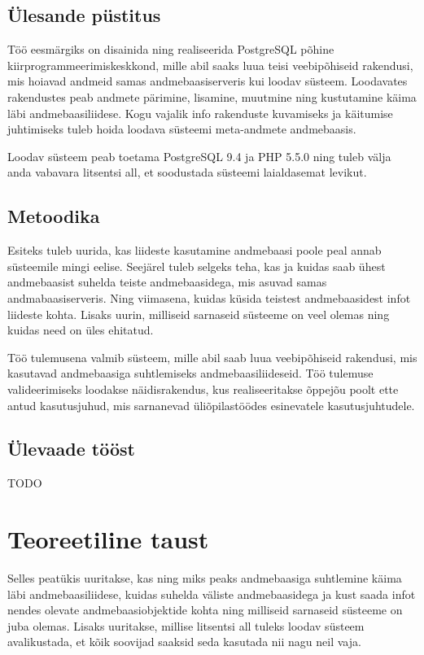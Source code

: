 \documentclass[a4paper,12pt]{article} %
\begin{document}
\subsection{Ülesande püstitus}
Töö eesmärgiks on disainida ning realiseerida PostgreSQL põhine kiirprogrammeerimiskeskkond, mille abil saaks luua teisi veebipõhiseid rakendusi, mis hoiavad andmeid samas andmebaasiserveris kui loodav süsteem. Loodavates rakendustes peab andmete pärimine, lisamine, muutmine ning kustutamine käima läbi andmebaasiliidese. Kogu vajalik info rakenduste kuvamiseks ja käitumise juhtimiseks tuleb hoida loodava süsteemi meta-andmete andmebaasis.\par
Loodav süsteem peab toetama PostgreSQL 9.4 ja PHP 5.5.0 ning tuleb välja anda vabavara litsentsi all, et soodustada süsteemi laialdasemat levikut.

\subsection{Metoodika}
Esiteks tuleb uurida, kas liideste kasutamine andmebaasi poole peal annab süsteemile mingi eelise. Seejärel tuleb selgeks teha, kas ja kuidas saab ühest andmebaasist suhelda teiste andmebaasidega, mis asuvad samas andmabaasiserveris. Ning viimasena, kuidas küsida teistest andmebaasidest infot liideste kohta.
Lisaks uurin, milliseid sarnaseid süsteeme on veel olemas ning kuidas need on üles ehitatud.\par
Töö tulemusena valmib süsteem, mille abil saab luua veebipõhiseid rakendusi, mis kasutavad andmebaasiga suhtlemiseks andmebaasiliideseid. Töö tulemuse valideerimiseks loodakse näidisrakendus, kus realiseeritakse õppejõu poolt ette antud kasutusjuhud, mis sarnanevad üliõpilastöödes esinevatele kasutusjuhtudele.
\subsection{Ülevaade tööst}
TODO
\pagebreak

\section{Teoreetiline taust}
Selles peatükis uuritakse, kas ning miks peaks andmebaasiga suhtlemine käima läbi andmebaasiliidese, kuidas suhelda väliste andmebaasidega ja kust saada infot nendes olevate andmebaasiobjektide kohta ning milliseid sarnaseid süsteeme on juba olemas. Lisaks uuritakse, millise litsentsi all tuleks loodav süsteem avalikustada, et kõik soovijad saaksid seda kasutada nii nagu neil vaja.
\end{document}
